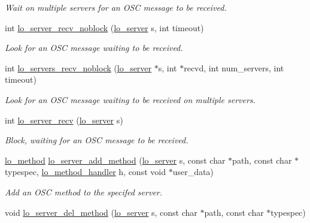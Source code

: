 \begin{DoxyCompactItemize}
\begin{DoxyCompactList}\small\item\em Wait on multiple servers for an O\+S\+C message to be received. \end{DoxyCompactList}\item 
int \hyperlink{group__liblolowlevel_ga784a257252d05cc0e7210f4691f0661b}{lo\+\_\+server\+\_\+recv\+\_\+noblock} (\hyperlink{lo__types_8h_a59067bf50cf8abb4371da6f03c9036c9}{lo\+\_\+server} s, int timeout)
\begin{DoxyCompactList}\small\item\em Look for an O\+S\+C message waiting to be received. \end{DoxyCompactList}\item 
int \hyperlink{group__liblolowlevel_ga2b7b00790f273135fab8fb9210dc61d2}{lo\+\_\+servers\+\_\+recv\+\_\+noblock} (\hyperlink{lo__types_8h_a59067bf50cf8abb4371da6f03c9036c9}{lo\+\_\+server} $\ast$s, int $\ast$recvd, int num\+\_\+servers, int timeout)
\begin{DoxyCompactList}\small\item\em Look for an O\+S\+C message waiting to be received on multiple servers. \end{DoxyCompactList}\item 
int \hyperlink{group__liblolowlevel_gaebef3611d24e4b5f60f16cce76a9e271}{lo\+\_\+server\+\_\+recv} (\hyperlink{lo__types_8h_a59067bf50cf8abb4371da6f03c9036c9}{lo\+\_\+server} s)
\begin{DoxyCompactList}\small\item\em Block, waiting for an O\+S\+C message to be received. \end{DoxyCompactList}\item 
\hyperlink{lo__types_8h_a66faedf5da13231d8c0166870477dce5}{lo\+\_\+method} \hyperlink{group__liblolowlevel_ga56c5f1d587c215c27e92e6436e12b1a3}{lo\+\_\+server\+\_\+add\+\_\+method} (\hyperlink{lo__types_8h_a59067bf50cf8abb4371da6f03c9036c9}{lo\+\_\+server} s, const char $\ast$path, const char $\ast$typespec, \hyperlink{lo__types_8h_a3b1c86c0925d05e13b5438ce8fe80a6c}{lo\+\_\+method\+\_\+handler} h, const void $\ast$user\+\_\+data)
\begin{DoxyCompactList}\small\item\em Add an O\+S\+C method to the specifed server. \end{DoxyCompactList}\item 
void \hyperlink{group__liblolowlevel_gaf834a6d62de7dcceaede62325e74c763}{lo\+\_\+server\+\_\+del\+\_\+method} (\hyperlink{lo__types_8h_a59067bf50cf8abb4371da6f03c9036c9}{lo\+\_\+server} s, const char $\ast$path, const char $\ast$typespec)

\end{DoxyCompactItemize}
